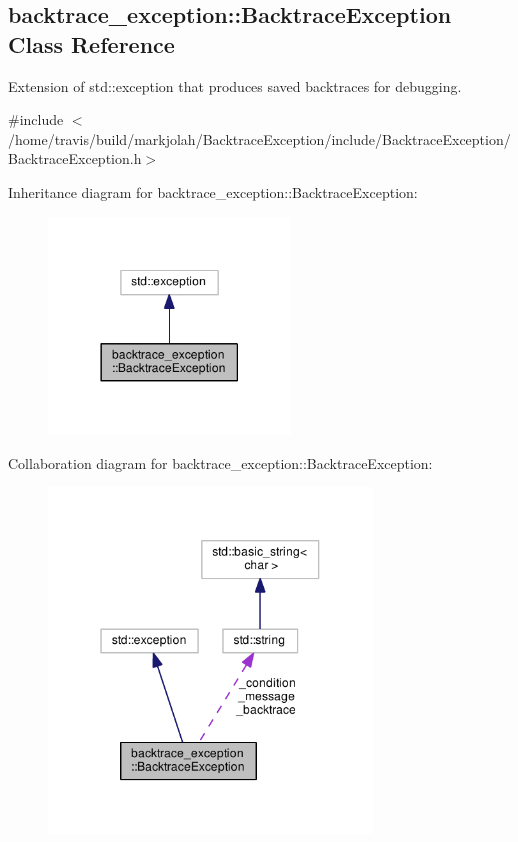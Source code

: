 \hypertarget{classbacktrace__exception_1_1BacktraceException}{}\subsection{backtrace\+\_\+exception\+:\+:Backtrace\+Exception Class Reference}
\label{classbacktrace__exception_1_1BacktraceException}


Extension of std\+::exception that produces saved backtraces for debugging.  




{\ttfamily \#include $<$/home/travis/build/markjolah/\+Backtrace\+Exception/include/\+Backtrace\+Exception/\+Backtrace\+Exception.\+h$>$}



Inheritance diagram for backtrace\+\_\+exception\+:\+:Backtrace\+Exception\+:\nopagebreak
\begin{figure}[H]
\begin{center}
\leavevmode
\includegraphics[width=182pt]{classbacktrace__exception_1_1BacktraceException__inherit__graph}
\end{center}
\end{figure}


Collaboration diagram for backtrace\+\_\+exception\+:\+:Backtrace\+Exception\+:\nopagebreak
\begin{figure}[H]
\begin{center}
\leavevmode
\includegraphics[width=244pt]{classbacktrace__exception_1_1BacktraceException__coll__graph}
\end{center}
\end{figure}
